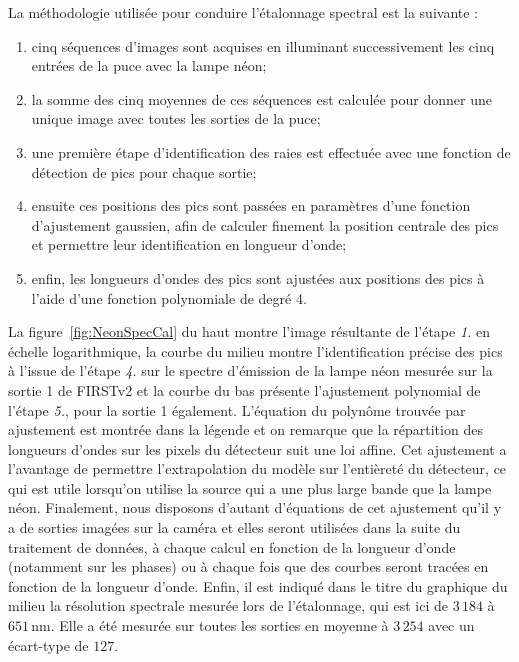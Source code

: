 La méthodologie utilisée pour conduire l'étalonnage spectral est la suivante :

\begin{enumerate}
    \item cinq séquences d'images sont acquises en illuminant successivement les cinq entrées de la puce avec la lampe néon;
    \item la somme des cinq moyennes de ces séquences est calculée pour donner une unique image avec toutes les sorties de la puce;
    \item une première étape d'identification des raies est effectuée avec une fonction de détection de pics pour chaque sortie;
    \item ensuite ces positions des pics sont passées en paramètres d'une fonction d'ajustement gaussien, afin de calculer finement la position centrale des pics et permettre leur identification en longueur d'onde;
    \item enfin, les longueurs d'ondes des pics sont ajustées aux positions des pics à l'aide d'une fonction polynomiale de degré 4.
\end{enumerate}

La figure~\ref{fig:NeonSpecCal} du haut montre l'image résultante de l'étape \textit{1.} en échelle logarithmique, la courbe du milieu montre l'identification précise des pics à l'issue de l'étape \textit{4.} sur le spectre d'émission de la lampe néon mesurée sur la sortie 1 de \ac{FIRSTv2} et la courbe du bas présente l'ajustement polynomial de l'étape \textit{5.}, pour la sortie 1 également. L'équation du polynôme trouvée par ajustement est montrée dans la légende et on remarque que la répartition des longueurs d'ondes sur les pixels du détecteur suit une loi affine. Cet ajustement a l'avantage de permettre l'extrapolation du modèle sur l'entièreté du détecteur, ce qui est utile lorsqu'on utilise la source \sk qui a une plus large bande que la lampe néon. Finalement, nous disposons d'autant d'équations de cet ajustement qu'il y a de sorties imagées sur la caméra et elles seront utilisées dans la suite du traitement de données, à chaque calcul en fonction de la longueur d'onde (notamment sur les phases) ou à chaque fois que des courbes seront tracées en fonction de la longueur d'onde. Enfin, il est indiqué dans le titre du graphique du milieu la résolution spectrale mesurée lors de l'étalonnage, qui est ici de $3\,184$ à $651 \,$nm. Elle a été mesurée sur toutes les sorties en moyenne à $3\,254$ avec un écart-type de $127$.

